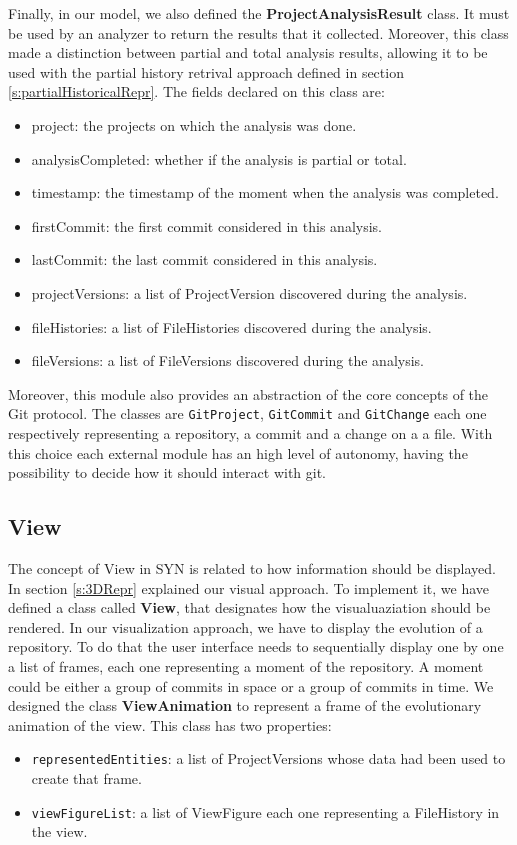 Finally, in our model, we also defined the \textbf{ProjectAnalysisResult} class. It must be used by an analyzer to return the results that it collected. Moreover, this class made a distinction between partial and total analysis results, allowing it to be used with the partial history retrival approach defined in section \ref{s:partialHistoricalRepr}. The fields declared on this class are:
\begin{itemize}
    \item project: the projects on which the analysis was done.
    \item analysisCompleted: whether if the analysis is partial or total.
    \item timestamp: the timestamp of the moment when the analysis was completed. 
    \item firstCommit: the first commit considered in this analysis. 
    \item lastCommit: the last commit considered in this analysis. 
    \item projectVersions: a list of ProjectVersion discovered during the analysis.
    \item fileHistories: a list of FileHistories discovered during the analysis.
    \item fileVersions: a list of FileVersions discovered during the analysis.
\end{itemize}

Moreover, this module also provides an abstraction of the core concepts of the Git protocol. The classes are \texttt{GitProject}, \texttt{GitCommit} and \texttt{GitChange} each one respectively representing a repository, a commit and a change on a a file. 
With this choice each external module has an high level of autonomy, having the possibility to decide how it should interact with git. 

\subsection*{View}
\label{s:view_impl}
The concept of View in SYN is related to how information should be displayed. In section \ref{s:3DRepr} explained our visual approach. To implement it, we have defined a class called \textbf{View}, that designates how the visualuaziation should be rendered. 
In our visualization approach, we have to display the evolution of a repository. To do that the user interface needs to sequentially display one by one a list of frames, each one representing a moment of the repository. A moment could be either a group of commits in space or a group of commits in time.
We designed the class \textbf{ViewAnimation} to represent a frame of the evolutionary animation of the view. This class has two properties:
\begin{itemize}
    \item \texttt{representedEntities}: a list of ProjectVersions whose data had been used to create that frame.
    \item \texttt{viewFigureList}: a list of ViewFigure each one representing a FileHistory in the view.
\end{itemize}

